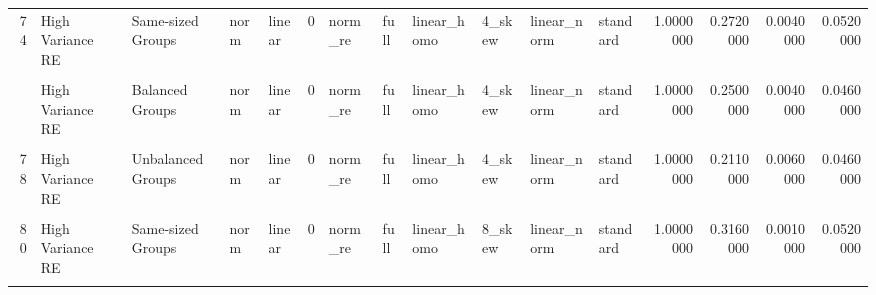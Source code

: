 \documentclass[12pt]{article}
\begin{document}
\begin{table}
{\begin{tabular}[t]{rllllrllllllrrrr}
74 & High Variance RE & Same-sized Groups & norm & linear & 0 & norm\_re & full & linear\_homo & 4\_skew & linear\_norm & standard & 1.0000000 & 0.2720000 & 0.0040000 & 0.0520000\\
\cellcolor{gray!6}{75} & \cellcolor{gray!6}{High Variance Error} & \cellcolor{gray!6}{Balanced Groups} & \cellcolor{gray!6}{norm} & \cellcolor{gray!6}{linear} & \cellcolor{gray!6}{0} & \cellcolor{gray!6}{norm\_re} & \cellcolor{gray!6}{full} & \cellcolor{gray!6}{linear\_homo} & \cellcolor{gray!6}{4\_skew} & \cellcolor{gray!6}{linear\_norm} & \cellcolor{gray!6}{standard} & \cellcolor{gray!6}{1.0000000} & \cellcolor{gray!6}{0.6150000} & \cellcolor{gray!6}{0.5960000} & \cellcolor{gray!6}{0.0430000}\\
\addlinespace
76 & High Variance RE & Balanced Groups & norm & linear & 0 & norm\_re & full & linear\_homo & 4\_skew & linear\_norm & standard & 1.0000000 & 0.2500000 & 0.0040000 & 0.0460000\\
\cellcolor{gray!6}{77} & \cellcolor{gray!6}{High Variance Error} & \cellcolor{gray!6}{Unbalanced Groups} & \cellcolor{gray!6}{norm} & \cellcolor{gray!6}{linear} & \cellcolor{gray!6}{0} & \cellcolor{gray!6}{norm\_re} & \cellcolor{gray!6}{full} & \cellcolor{gray!6}{linear\_homo} & \cellcolor{gray!6}{4\_skew} & \cellcolor{gray!6}{linear\_norm} & \cellcolor{gray!6}{standard} & \cellcolor{gray!6}{1.0000000} & \cellcolor{gray!6}{0.5210000} & \cellcolor{gray!6}{0.6370000} & \cellcolor{gray!6}{0.0500000}\\
78 & High Variance RE & Unbalanced Groups & norm & linear & 0 & norm\_re & full & linear\_homo & 4\_skew & linear\_norm & standard & 1.0000000 & 0.2110000 & 0.0060000 & 0.0460000\\
\cellcolor{gray!6}{79} & \cellcolor{gray!6}{High Variance Error} & \cellcolor{gray!6}{Same-sized Groups} & \cellcolor{gray!6}{norm} & \cellcolor{gray!6}{linear} & \cellcolor{gray!6}{0} & \cellcolor{gray!6}{norm\_re} & \cellcolor{gray!6}{full} & \cellcolor{gray!6}{linear\_homo} & \cellcolor{gray!6}{8\_skew} & \cellcolor{gray!6}{linear\_norm} & \cellcolor{gray!6}{standard} & \cellcolor{gray!6}{1.0000000} & \cellcolor{gray!6}{0.6530000} & \cellcolor{gray!6}{0.7930000} & \cellcolor{gray!6}{0.0380000}\\
80 & High Variance RE & Same-sized Groups & norm & linear & 0 & norm\_re & full & linear\_homo & 8\_skew & linear\_norm & standard & 1.0000000 & 0.3160000 & 0.0010000 & 0.0520000\\
\addlinespace
\cellcolor{gray!6}{81} & \cellcolor{gray!6}{High Variance Error} & \cellcolor{gray!6}{Balanced Groups} & \cellcolor{gray!6}{norm} & \cellcolor{gray!6}{linear} & \cellcolor{gray!6}{0} & \cellcolor{gray!6}{norm\_re} & \cellcolor{gray!6}{full} & \cellcolor{gray!6}{linear\_homo} & \cellcolor{gray!6}{8\_skew} & \cellcolor{gray!6}{linear\_norm} & \cellcolor{gray!6}{standard} & \cellcolor{gray!6}{1.0000000} & \cellcolor{gray!6}{0.6300000} & \cellcolor{gray!6}{0.7440000} & \cellcolor{gray!6}{0.0470000}\\

\end{tabular}}
\end{table}
\end{document}
